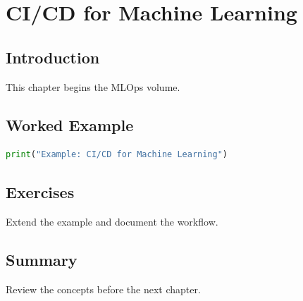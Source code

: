\chapter{CI/CD for Machine Learning}
\label{chap:vol10-4}



\section{Introduction}
This chapter begins the MLOps volume.

\section{Worked Example}
\begin{lstlisting}[language=Python]
print("Example: CI/CD for Machine Learning")
\end{lstlisting}

\section{Exercises}
\begin{exercise}
Extend the example and document the workflow.
\end{exercise}

\section{Summary}
Review the concepts before the next chapter.
